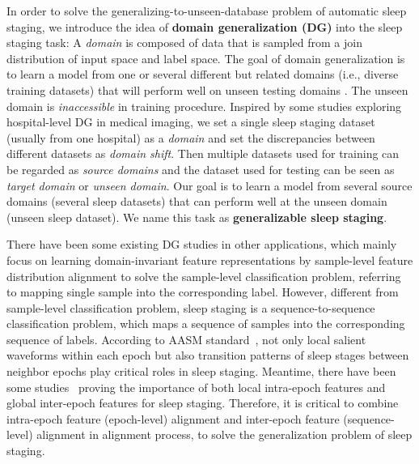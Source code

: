 \documentclass[letterpaper]{article} %
\begin{document}
	In order to solve the generalizing-to-unseen-database problem of automatic sleep staging, we introduce the idea of \textbf{domain generalization (DG)} into the sleep staging task:
	A \textit{domain} is composed of data that is sampled from a join distribution of input space and label space.
	The goal of domain generalization is to learn a model from one or several different but related domains (i.e., diverse training datasets) that will perform well on unseen testing domains \citep{wang2022generalizing}.
	The unseen domain is \textit{inaccessible} in training procedure.
	Inspired by some studies \citep{koh2021wilds, robey2021model} exploring hospital-level DG in medical imaging,
	we set a single sleep staging dataset (usually from one hospital) as a \textit{domain} and set the discrepancies between different datasets as \textit{domain shift}.
	Then multiple datasets used for training can be regarded as \textit{source domains} and the dataset used for testing can be seen as \textit{target domain} or \textit{unseen domain}.
	Our goal is to learn a model from several source domains (several sleep datasets) that can perform well at the unseen domain (unseen sleep dataset). We name this task as \textbf{generalizable sleep staging}.

	There have been some existing DG studies \citep{muandet2013domain, li2018domain, li2018dg, matsuura2020domain, zhou2020domain} in other applications, which mainly focus on learning domain-invariant feature representations by sample-level feature distribution alignment to solve the sample-level classification problem, referring to mapping single sample into the corresponding label.
	However, different from sample-level classification problem, sleep staging is a sequence-to-sequence classification problem, which maps a sequence of samples into the corresponding sequence of labels.
	According to AASM standard~\citep{Iber2007TheAA}, not only local salient waveforms within each epoch but also transition patterns of sleep stages between neighbor epochs play critical roles in sleep staging. Meantime, there have been some studies~\citep{Eldele2021AnAD, Phan2021XSleepNetMS} proving the importance of both local intra-epoch features and global inter-epoch features for sleep staging.
	Therefore, it is critical to combine intra-epoch feature (epoch-level) alignment and inter-epoch feature (sequence-level) alignment in alignment process, to solve the generalization problem of sleep staging.
\end{document}

